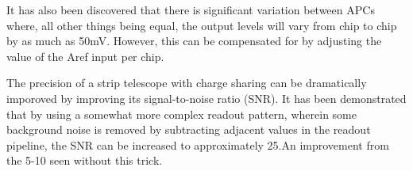 \documentclass{article}
\begin{document}
It has also been discovered that there is significant variation between APCs where, all other things being equal, the output levels will vary from chip to chip by as much as 50mV.\cite{Ryser2013} However, this can be compensated for by adjusting the value of the Aref input per chip. 

The precision of a strip telescope with charge sharing can be dramatically imporoved by improving its signal-to-noise ratio (SNR). It has been demonstrated that by using a somewhat more complex readout pattern, wherein some background noise is removed by subtracting adjacent values in the readout pipeline, the SNR can be increased to approximately 25.An improvement from the 5-10 seen without this trick.\cite{Ryser2013} 
\end{document}
